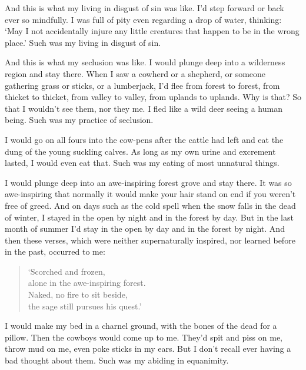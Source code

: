 \documentclass[12pt,openany]{book}%
\begin{document}
And this is what my living in disgust of sin was like. I’d step forward or back ever so mindfully. I was full of pity even regarding a drop of water, thinking: ‘May I not accidentally injure any little creatures that happen to be in the wrong place.’ Such was my living in disgust of sin. 

And this is what my seclusion was like. I would plunge deep into a wilderness region and stay there. When I saw a cowherd or a shepherd, or someone gathering grass or sticks, or a lumberjack, I’d flee from forest to forest, from thicket to thicket, from valley to valley, from uplands to uplands. Why is that? So that I wouldn’t see them, nor they me. I fled like a wild deer seeing a human being. Such was my practice of seclusion. 

I would go on all fours into the cow-pens after the cattle had left and eat the dung of the young suckling calves. As long as my own urine and excrement lasted, I would even eat that. Such was my eating of most unnatural things. 

I would plunge deep into an awe-inspiring forest grove and stay there. It was so awe-inspiring that normally it would make your hair stand on end if you weren’t free of greed. And on days such as the cold spell when the snow falls in the dead of winter, I stayed in the open by night and in the forest by day. But in the last month of summer I’d stay in the open by day and in the forest by night. And then these verses, which were neither supernaturally inspired, nor learned before in the past, occurred to me: 

\begin{verse}%
‘Scorched and frozen, \\
alone in the awe-inspiring forest. \\
Naked, no fire to sit beside, \\
the sage still pursues his quest.’ 

%
\end{verse}

I would make my bed in a charnel ground, with the bones of the dead for a pillow. Then the cowboys would come up to me. They’d spit and piss on me, throw mud on me, even poke sticks in my ears. But I don’t recall ever having a bad thought about them. Such was my abiding in equanimity. 
\end{document}
